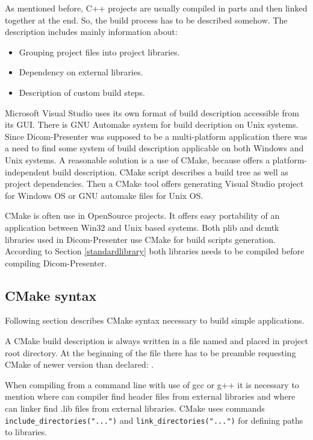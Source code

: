 As mentioned before, C++ projects are usually compiled in parts and then linked together at the end. So, the build process has to be described somehow. The description includes mainly information about:

\begin{itemize}
\item Grouping project files into project libraries.
\item Dependency on external libraries.
\item Description of custom build steps.
\end{itemize}

Microsoft Visual Studio uses its own format of build description accessible from its GUI. There is GNU Automake system for build decription on Unix systems. Since Dicom-Presenter was supposed to be a multi-platform application there was a need to find some system of build description applicable on both Windows and Unix systems. A reasonable solution is a use of CMake, because offers a platform-independent build description. CMake script describes a build tree as well as project dependencies. Then a CMake tool offers generating Visual Studio project for Windows OS or GNU automake files for Unix OS.

CMake is often use in OpenSource projects. It offers easy portability of an application between Win32 and Unix based systems. Both plib and dcmtk libraries used in Dicom-Presenter use CMake for build scripts generation. According to Section \ref{standardlibrary} both libraries needs to be compiled before compiling Dicom-Presenter.

\subsection{CMake syntax}


Following section describes CMake syntax necessary to build simple applications. 

A CMake build description is always written in a file named  and placed in project root directory. At the beginning of the file there has to be preamble requesting CMake of newer version than declared: .

When compiling from a command line with use of gcc or g++ it is necessary to mention where can compiler find header files from external libraries and where can linker find .lib files from external libraries. CMake uses commands \texttt{include\-\_directories\-("...")} and \texttt{link\-\_directories\-("...")} for defining paths to libraries.

